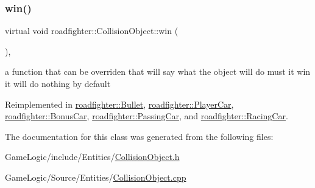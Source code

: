 \subsubsection{\texorpdfstring{win()}{win()}}
{\footnotesize\ttfamily virtual void roadfighter\+::\+Collision\+Object\+::win (\begin{DoxyParamCaption}{ }\end{DoxyParamCaption})\hspace{0.3cm}{\ttfamily [inline]}, {\ttfamily [virtual]}}

a function that can be overriden that will say what the object will do must it win it will do nothing by default 

Reimplemented in \hyperlink{classroadfighter_1_1Bullet_a566adb0235665312365cd65536c2aafc}{roadfighter\+::\+Bullet}, \hyperlink{classroadfighter_1_1PlayerCar_a12f0da24565a4fe64a7bf17fc7c37152}{roadfighter\+::\+Player\+Car}, \hyperlink{classroadfighter_1_1BonusCar_afb2d142de799694db896ba875d7d0c27}{roadfighter\+::\+Bonus\+Car}, \hyperlink{classroadfighter_1_1PassingCar_a365d8befb1c2fd34337fc25665ccc73f}{roadfighter\+::\+Passing\+Car}, and \hyperlink{classroadfighter_1_1RacingCar_a24293ac56920da01d29fe99aee8d3ea6}{roadfighter\+::\+Racing\+Car}.



The documentation for this class was generated from the following files\+:\begin{DoxyCompactItemize}
\item 
Game\+Logic/include/\+Entities/\hyperlink{CollisionObject_8h}{Collision\+Object.\+h}\item 
Game\+Logic/\+Source/\+Entities/\hyperlink{CollisionObject_8cpp}{Collision\+Object.\+cpp}\end{DoxyCompactItemize}
